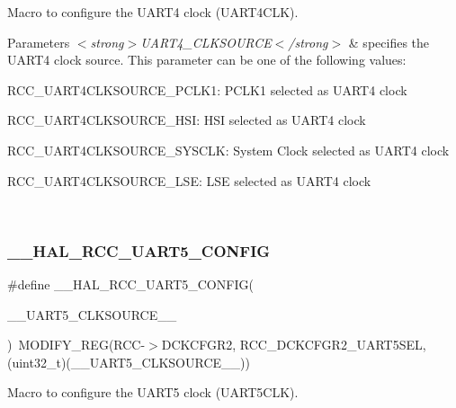 Macro to configure the U\+A\+R\+T4 clock (U\+A\+R\+T4\+C\+LK). 


\begin{DoxyParams}{Parameters}
{\em $<$strong$>$\+U\+A\+R\+T4\+\_\+\+C\+L\+K\+S\+O\+U\+R\+C\+E$<$/strong$>$} & specifies the U\+A\+R\+T4 clock source. This parameter can be one of the following values\+: \begin{DoxyItemize}
\item R\+C\+C\+\_\+\+U\+A\+R\+T4\+C\+L\+K\+S\+O\+U\+R\+C\+E\+\_\+\+P\+C\+L\+K1\+: P\+C\+L\+K1 selected as U\+A\+R\+T4 clock \item R\+C\+C\+\_\+\+U\+A\+R\+T4\+C\+L\+K\+S\+O\+U\+R\+C\+E\+\_\+\+H\+SI\+: H\+SI selected as U\+A\+R\+T4 clock \item R\+C\+C\+\_\+\+U\+A\+R\+T4\+C\+L\+K\+S\+O\+U\+R\+C\+E\+\_\+\+S\+Y\+S\+C\+LK\+: System Clock selected as U\+A\+R\+T4 clock \item R\+C\+C\+\_\+\+U\+A\+R\+T4\+C\+L\+K\+S\+O\+U\+R\+C\+E\+\_\+\+L\+SE\+: L\+SE selected as U\+A\+R\+T4 clock \end{DoxyItemize}
\\
\hline
\end{DoxyParams}
\mbox{\label{group___r_c_c_ex___exported___macros_ga3115ed733d8be4b363e3324a024479b5}} 
\subsubsection{\texorpdfstring{\_\_HAL\_RCC\_UART5\_CONFIG}{\_\_HAL\_RCC\_UART5\_CONFIG}}
{\footnotesize\ttfamily \#define \+\_\+\+\_\+\+H\+A\+L\+\_\+\+R\+C\+C\+\_\+\+U\+A\+R\+T5\+\_\+\+C\+O\+N\+F\+IG(\begin{DoxyParamCaption}\item[{}]{\+\_\+\+\_\+\+U\+A\+R\+T5\+\_\+\+C\+L\+K\+S\+O\+U\+R\+C\+E\+\_\+\+\_\+ }\end{DoxyParamCaption})~M\+O\+D\+I\+F\+Y\+\_\+\+R\+EG(R\+CC-\/$>$D\+C\+K\+C\+F\+G\+R2, R\+C\+C\+\_\+\+D\+C\+K\+C\+F\+G\+R2\+\_\+\+U\+A\+R\+T5\+S\+EL, (uint32\+\_\+t)(\+\_\+\+\_\+\+U\+A\+R\+T5\+\_\+\+C\+L\+K\+S\+O\+U\+R\+C\+E\+\_\+\+\_\+))}



Macro to configure the U\+A\+R\+T5 clock (U\+A\+R\+T5\+C\+LK). 


